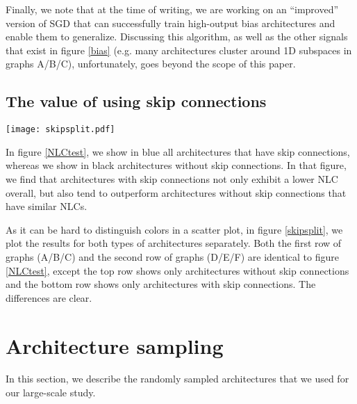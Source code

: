 \documentclass{article} %
\begin{document}
Finally, we note that at the time of writing, we are working on an ``improved'' version of SGD that can successfully train high-output bias architectures and enable them to generalize. Discussing this algorithm, as well as the other signals that exist in figure \ref{bias} (e.g. many architectures cluster around 1D subspaces in graphs A/B/C), unfortunately, goes beyond the scope of this paper. 

\subsection{The value of using skip connections} \label{skipsplitSection}

\begin{figure*}[!ht]
\texttt{[image: skipsplit.pdf]}
\caption{Both the first row of graphs (A/B/C) and the second row of graphs (D/E/F) are identical to figure \ref{NLCtest}, except the top row shows only architectures without skip connections and the bottom row shows only architectures with skip connections. Again, red color indicates architectures with high output bias.}  \label{skipsplit}
\end{figure*}

In figure \ref{NLCtest}, we show in blue all architectures that have skip connections, whereas we show in black architectures without skip connections. In that figure, we find that architectures with skip connections not only exhibit a lower NLC overall, but also tend to outperform architectures without skip connections that have similar NLCs. 

As it can be hard to distinguish colors in a scatter plot, in figure \ref{skipsplit}, we plot the results for both types of architectures separately. Both the first row of graphs (A/B/C) and the second row of graphs (D/E/F) are identical to figure \ref{NLCtest}, except the top row shows only architectures without skip connections and the bottom row shows only architectures with skip connections. The differences are clear.


\section{Architecture sampling} \label{architectureSection}

In this section, we describe the randomly sampled architectures that we used for our large-scale study.
\end{document}
